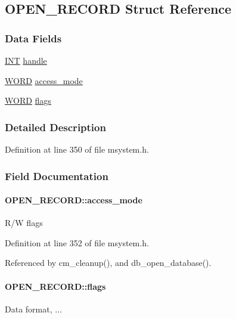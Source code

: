 \subsection{OPEN\_\-RECORD Struct Reference}
\label{structOPEN__RECORD}
\subsubsection*{Data Fields}
\begin{DoxyCompactItemize}
\item 
\hyperlink{vppg_8h_a392e62da233ed3e2f7c3fd4f487a3896}{INT} \hyperlink{structOPEN__RECORD_a9f30758afbcd2516daef6d08369fc12b}{handle}
\item 
\hyperlink{vt2_8h_a2b0e863dadf920709ec53d9088ee7c91}{WORD} \hyperlink{structOPEN__RECORD_a485f32805b99fb2c9b6449a25e143600}{access\_\-mode}
\item 
\hyperlink{vt2_8h_a2b0e863dadf920709ec53d9088ee7c91}{WORD} \hyperlink{structOPEN__RECORD_a157936e4e42b6b79afdf48f45e3220ff}{flags}
\end{DoxyCompactItemize}


\subsubsection{Detailed Description}


Definition at line 350 of file msystem.h.

\subsubsection{Field Documentation}
\paragraph[{access\_\-mode}]{ {\bf OPEN\_\-RECORD::access\_\-mode}}\hfill\label{structOPEN__RECORD_a485f32805b99fb2c9b6449a25e143600}
R/W flags 

Definition at line 352 of file msystem.h.

Referenced by cm\_\-cleanup(), and db\_\-open\_\-database().
\paragraph[{flags}]{ {\bf OPEN\_\-RECORD::flags}}\hfill\label{structOPEN__RECORD_a157936e4e42b6b79afdf48f45e3220ff}
Data format, ... 

